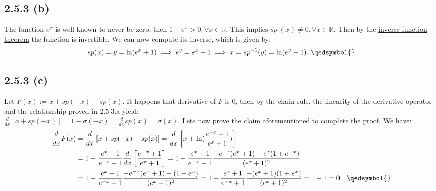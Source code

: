 \documentclass{exam}
\begin{document}
\subsection*{2.5.3 (b)}
The function $e^x$ is well known to never be zero, then $1 + e^x > 0, \forall x \in \mathbb{R}$. This implies $sp^{\prime}(x) \neq 0, \forall x \in \mathbb{R}$. Then by the \href{https://en.wikipedia.org/wiki/Inverse_function_theorem}{inverse function theorem} the function is 
invertible. We can now compute its inverse, which is given by:
\begin{equation*}
    sp(x) = y = \text{ln}(e^x + 1 ) \implies e^y = e^x + 1 \implies x = sp^{-1}(y) = \text{ln}(e^y - 1). \ \qedsymbol{}
\end{equation*}

\subsection*{2.5.3 (c)}
Let $F(x) :=  x + sp(-x) - sp(x)$. It happens that derivative of $F$ is 0, then by the chain rule, the linearity of the derivative operator and the relationship 
proved in 2.5.3.a yield: \newline
\\
$\frac{d}{d x } \left[ x + sp(-x) \right] = 1 - \sigma(-x) = \frac{d}{d x}sp(x) = \sigma(x)$. Lets now prove the claim aforementioned to complete the proof. We have: 
\begin{equation*}
    \begin{aligned}
        \frac{d}{d x } F(x) &= \frac{d}{d x } \left[ x + sp(-x) - sp(x)\right] = \frac{d}{d x } \left[ x + \text{ln}(\frac{e^{-x} + 1 }{e^x + 1})\right]\\
         &= 1 + \frac{e^x + 1 }{e^{-x} + 1}\frac{d}{d x }\left[\frac{e^{-x} + 1 }{e^{x} + 1}\right] = 1 + \frac{e^x + 1 }{e^{-x} + 1}\frac{-e^{-x}(e^x + 1) - e^x(1 + e^{-x})}{(e^{x} + 1)^2}\\
         &= 1 + \frac{e^x + 1 }{e^{-x} + 1}\frac{-e^{-x}(e^x + 1) - (1 + e^{x})}{(e^{x} + 1)^2} = 1 + \frac{e^x + 1 }{e^{-x} + 1}\frac{-(e^x + 1)(1 + e^{x})}{(e^{x} + 1)^2} = 1 - 1 = 0. \text{\ \ \qedsymbol{}}
    \end{aligned}
\end{equation*}
\end{document}
